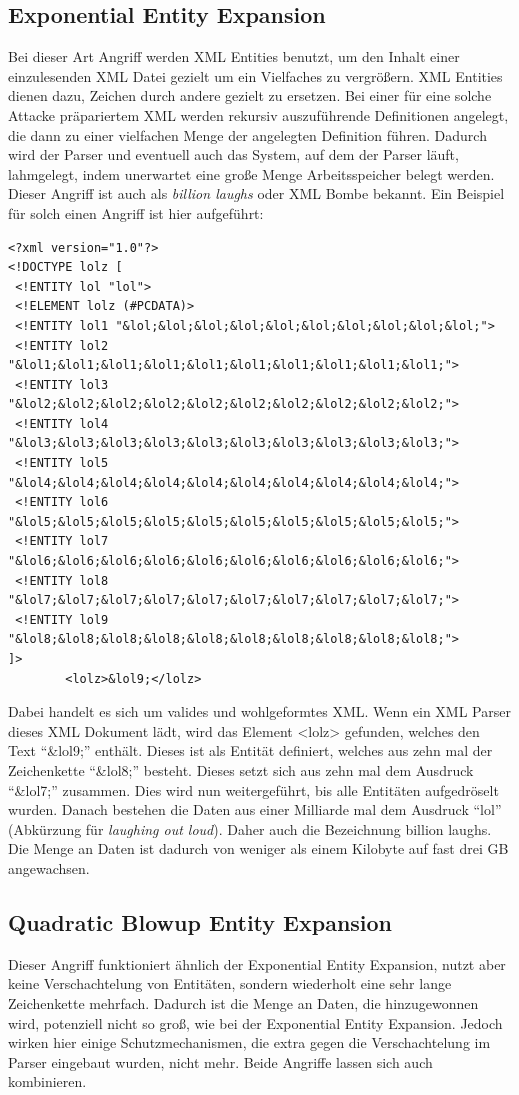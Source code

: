 		\subsection{Exponential Entity Expansion}
		Bei dieser Art Angriff werden XML Entities benutzt, um den Inhalt einer
		einzulesenden XML Datei gezielt um ein Vielfaches zu vergrößern. XML Entities
		dienen dazu, Zeichen durch andere gezielt zu ersetzen. Bei einer
		für eine solche Attacke präpariertem XML werden rekursiv auszuführende
		Definitionen angelegt, die dann zu einer vielfachen Menge der angelegten
		Definition führen. Dadurch wird der Parser und eventuell auch das System, auf
		dem der Parser läuft, lahmgelegt, indem unerwartet eine große Menge
		Arbeitsspeicher belegt werden. Dieser Angriff ist auch als \textit{billion laughs} oder XML
		Bombe bekannt.\cite{Sul09} Ein Beispiel für solch einen Angriff ist hier aufgeführt:
		\begin{lstlisting}
<?xml version="1.0"?>
<!DOCTYPE lolz [
 <!ENTITY lol "lol">
 <!ELEMENT lolz (#PCDATA)>
 <!ENTITY lol1 "&lol;&lol;&lol;&lol;&lol;&lol;&lol;&lol;&lol;&lol;">
 <!ENTITY lol2 "&lol1;&lol1;&lol1;&lol1;&lol1;&lol1;&lol1;&lol1;&lol1;&lol1;">
 <!ENTITY lol3 "&lol2;&lol2;&lol2;&lol2;&lol2;&lol2;&lol2;&lol2;&lol2;&lol2;">
 <!ENTITY lol4 "&lol3;&lol3;&lol3;&lol3;&lol3;&lol3;&lol3;&lol3;&lol3;&lol3;">
 <!ENTITY lol5 "&lol4;&lol4;&lol4;&lol4;&lol4;&lol4;&lol4;&lol4;&lol4;&lol4;">
 <!ENTITY lol6 "&lol5;&lol5;&lol5;&lol5;&lol5;&lol5;&lol5;&lol5;&lol5;&lol5;">
 <!ENTITY lol7 "&lol6;&lol6;&lol6;&lol6;&lol6;&lol6;&lol6;&lol6;&lol6;&lol6;">
 <!ENTITY lol8 "&lol7;&lol7;&lol7;&lol7;&lol7;&lol7;&lol7;&lol7;&lol7;&lol7;">
 <!ENTITY lol9 "&lol8;&lol8;&lol8;&lol8;&lol8;&lol8;&lol8;&lol8;&lol8;&lol8;">
]>
		<lolz>&lol9;</lolz>
		\end{lstlisting}
		Dabei handelt es sich um valides und wohlgeformtes XML. Wenn ein XML Parser
		dieses XML Dokument lädt, wird das Element <lolz> gefunden, welches den Text
		“&lol9;” enthält. Dieses ist als Entität definiert, welches aus zehn mal der
		Zeichenkette “&lol8;” besteht. Dieses setzt sich aus zehn mal
		dem Ausdruck “&lol7;”  zusammen. Dies wird nun weitergeführt, bis alle
		Entitäten aufgedröselt wurden. Danach bestehen die Daten aus einer Milliarde
		mal dem Ausdruck "`lol"' (Abkürzung für \textit{laughing out loud}). Daher
		auch die Bezeichnung billion laughs.
		Die Menge an Daten ist dadurch von weniger als einem Kilobyte auf fast drei GB
		angewachsen.\cite{Sul09}
		
		\subsection{Quadratic Blowup Entity Expansion}
		Dieser Angriff funktioniert ähnlich der Exponential Entity Expansion, nutzt
		aber keine Verschachtelung von Entitäten, sondern wiederholt eine sehr lange
		Zeichenkette mehrfach. Dadurch ist die Menge an Daten, die hinzugewonnen wird,
		potenziell nicht so groß, wie bei der Exponential Entity Expansion. Jedoch
		wirken hier einige Schutzmechanismen, die extra gegen die Verschachtelung im
		Parser eingebaut wurden, nicht mehr. Beide Angriffe lassen sich auch
		kombinieren.\cite{defusedxml}
		
